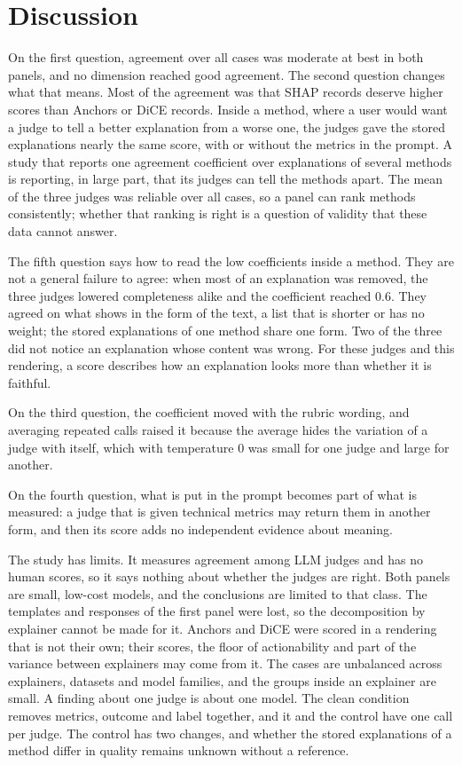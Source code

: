 \documentclass[12pt,letterpaper]{article}
\begin{document}
\section{Discussion}

On the first question, agreement over all cases was moderate at best in both panels,
and no dimension reached good agreement. The second question changes what that means.
Most of the agreement was that SHAP records deserve higher scores than Anchors or DiCE records.
Inside a method, where a user would want a judge to tell a better explanation from a
worse one, the judges gave the stored explanations nearly the same score, with or without
the metrics in the prompt. A study that reports one agreement coefficient over
explanations of several methods is reporting, in large part, that its judges can tell
the methods apart. The mean of the three judges was reliable over all cases, so a panel
can rank methods consistently; whether that ranking is right is a question of validity
that these data cannot answer.

The fifth question says how to read the low coefficients inside a method. They are not a
general failure to agree: when most of an explanation was removed, the three judges
lowered completeness alike and the coefficient reached 0.6. They agreed on what shows in
the form of the text, a list that is shorter or has no weight; the stored explanations of
one method share one form. Two of the three did not notice an explanation whose content
was wrong. For these judges and this rendering, a score describes how an explanation
looks more than whether it is faithful.

On the third question, the coefficient moved with the rubric wording, and averaging
repeated calls raised it because the average hides the variation of a judge with itself,
which with temperature 0 was small for one judge and large for another.

On the fourth question, what is put in the prompt becomes part of what is measured: a
judge that is given technical metrics may return them in another form, and then its
score adds no independent evidence about meaning.

The study has limits. It measures agreement among LLM judges and has no human scores, so
it says nothing about whether the judges are right. Both panels are small, low-cost
models, and the conclusions are limited to that class. The templates and responses of
the first panel were lost, so the decomposition by explainer cannot be made for it. Anchors
and DiCE were scored in a rendering that is not their own; their scores, the floor of
actionability and part of the variance between explainers may come from it. The cases
are unbalanced across explainers, datasets and model families, and the groups inside an
explainer are small. A finding about one judge is about one model. The clean condition removes
metrics, outcome and label together, and it and the control have one call per judge. The
control has two changes, and whether the stored explanations of a method differ in
quality remains unknown without a reference.
\end{document}
